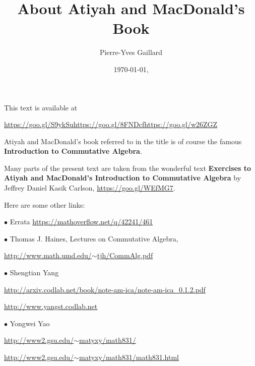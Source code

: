 \documentclass[parskip=half,fontsize=12pt]{scrartcl}%
\title{About Atiyah and MacDonald's Book}
\author{Pierre-Yves Gaillard}
\date{\today,\currenttime}
\newcommand{\oo}{\operatorname}\newcommand{\ooo}{\operatorname*}
\newcommand{\bu}{\bullet}
\begin{document}


\maketitle\tableofcontents

This text is available at 

\href{http://www.iecl.univ-lorraine.fr/~Pierre-Yves.Gaillard/DIVERS/Atiyah_MacDonald_c/}{https://goo.gl/S9ykSu}\quad\href{https://github.com/Pierre-Yves-Gaillard/Atiyah_MacDonald_c/blob/master/Atiyah_MacDonald_c.tex}{https://goo.gl/8FNDcf}\quad\href{https://docs.google.com/document/d/1AW4qMXoarPW1L1Nxbgy4bODorWEpE6_Gdd35sFJKyew/edit?usp=sharing}{https://goo.gl/w26ZGZ}

Atiyah and MacDonald's book referred to in the title is of course the famous \textbf{Introduction to Commutative Algebra}.

Many parts of the present text are taken from the wonderful text \textbf{Exercises to Atiyah and MacDonald's Introduction to Commutative Algebra} by Jeffrey Daniel Kasik Carlson, \href{https://goo.gl/WEfMG7}{https://goo.gl/WEfMG7}.

Here are some other links:

$\bu$ Errata \href{https://mathoverflow.net/q/42241/461}{https://mathoverflow.net/q/42241/461}


$\bu$ Thomas J. Haines, Lectures on Commutative Algebra, 

\href{http://www.math.umd.edu/~tjh/CommAlg.pdf}{http://www.math.umd.edu/$\sim$tjh/CommAlg.pdf}

$\bu$ Shengtian Yang 

\href{http://arxiv.codlab.net/book/note-am-ica/note-am-ica_0.1.2.pdf}{\small http://arxiv.codlab.net/book/note-am-ica/note-am-ica\_0.1.2.pdf}

\href{http://www.yangst.codlab.net}{http://www.yangst.codlab.net}

$\bu$ Yongwei Yao

\href{http://www2.gsu.edu/~matyxy/math831/}{http://www2.gsu.edu/$\sim$matyxy/math831/}

\href{http://www2.gsu.edu/~matyxy/math831/math831.html}{http://www2.gsu.edu/$\sim$matyxy/math831/math831.html}

\end{document}
